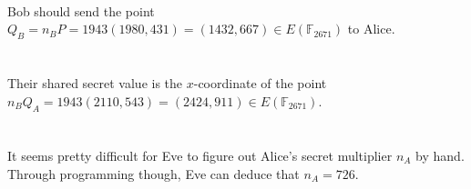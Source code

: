 \documentclass[
  coursecode={MTHE 418},
  assignmentname={Homework \homeworknumber},
  studentnumber=20053722,
  name={Bryan Hoang},
  draft,
]{
  ltxanswer%
}
\begin{document}
  \begin{questions}
    \setcounter{question}{\questionnumber}
    \addtocounter{question}{-1}
    \question[10]\
    \begin{parts}
      \part{}
      \begin{solution}
        Bob should send the point \(Q_{B} = n_{B} P = 1943 (1980, 431) = \boxed{(1432, 667)} \in E(\mathbb{F}_{2671})\) to Alice.
      \end{solution}

      \part{}
      \begin{solution}
        Their shared secret value is the \(x\)-coordinate of the point \(n_{B} Q_{A} = 1943 (2110, 543) = (\boxed{2424}, 911) \in E(\mathbb{F}_{2671})\).
      \end{solution}

      \part{}
      \begin{solution}
        It seems pretty difficult for Eve to figure out Alice's secret multiplier \(n_{A}\) by hand. Through programming though, Eve can deduce that \(\boxed{n_{A} = 726}\).
      \end{solution}
    \end{parts}
  \end{questions}
\end{document}
